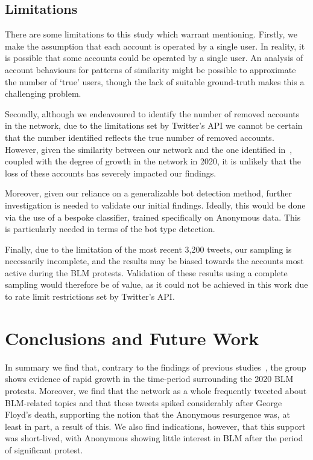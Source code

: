 \documentclass[letterpaper]{article}
\begin{document}
\subsection{Limitations}

There are some limitations to this study which warrant mentioning. Firstly, we make the assumption that each account is operated by a single user. In reality, it is possible that some accounts could be operated by a single user. An analysis of account behaviours for patterns of similarity might be possible to approximate the number of `true' users, though the lack of suitable ground-truth makes this a challenging problem.

Secondly, although we endeavoured to identify the number of removed accounts in the network, due to the limitations set by Twitter's API we cannot be certain that the number identified reflects the true number of removed accounts. However, given the similarity between our network and the one identified in~\cite{Jones2020}, coupled with the degree of growth in the network in 2020, it is unlikely that the loss of these accounts has severely impacted our findings.

Moreover, given our reliance on a generalizable bot detection method, further investigation is needed to validate our initial findings. Ideally, this would be done via the use of a bespoke classifier, trained specifically on Anonymous data. This is particularly needed in terms of the bot type detection.

Finally, due to the limitation of the most recent 3,200 tweets, our sampling is necessarily incomplete, and the results may be biased towards the accounts most active during the BLM protests. Validation of these results using a complete sampling would therefore be of value, as it could not be achieved in this work due to rate limit restrictions set by Twitter's API.

\section{Conclusions and Future Work}

In summary we find that, contrary to the findings of previous studies~\cite{Jones2020,Uitermark2017}, the group shows evidence of rapid growth in the time-period surrounding the 2020 BLM protests. Moreover, we find that the network as a whole frequently tweeted about BLM-related topics and that these tweets spiked considerably after George Floyd's death, supporting the notion that the Anonymous resurgence was, at least in part, a result of this. We also find indications, however, that this support was short-lived, with Anonymous showing little interest in BLM after the period of significant protest.
\end{document}
